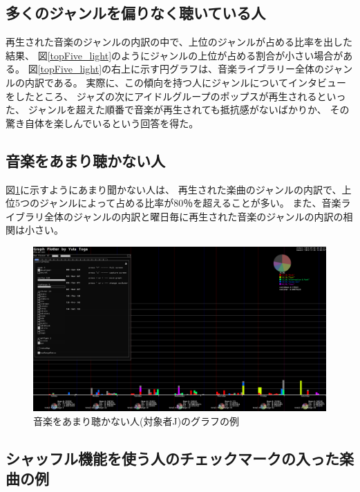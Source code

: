 \documentclass[a4paper, 11pt, onecolumn, report]{jsarticle}
\begin{document}
\clearpage

\subsection{多くのジャンルを偏りなく聴いている人}
再生された音楽のジャンルの内訳の中で、上位のジャンルが占める比率を出した結果、
図\ref{topFive_light}のようにジャンルの上位が占める割合が小さい場合がある。
図\ref{topFive_light}の右上に示す円グラフは、音楽ライブラリー全体のジャンルの内訳である。
実際に、この傾向を持つ人にジャンルについてインタビューをしたところ、
ジャズの次にアイドルグループのポップスが再生されるといった、
ジャンルを超えた順番で音楽が再生されても抵抗感がないばかりか、
その驚き自体を楽しんでいるという回答を得た。




\subsection{音楽をあまり聴かない人}
図\ref{lightListner}に示すようにあまり聞かない人は、
再生された楽曲のジャンルの内訳で、上位5つのジャンルによって占める比率が80％を超えることが多い。
また、音楽ライブラリ全体のジャンルの内訳と曜日毎に再生された音楽のジャンルの内訳の相関は小さい。

\begin{figure}[h]
\begin{center}
\includegraphics[width=14cm]{takino.png}
\caption{音楽をあまり聴かない人(対象者J)のグラフの例}
\label{lightListner}
\end{center}
\end{figure}

\clearpage

\subsection{シャッフル機能を使う人のチェックマークの入った楽曲の例}
\end{document}
